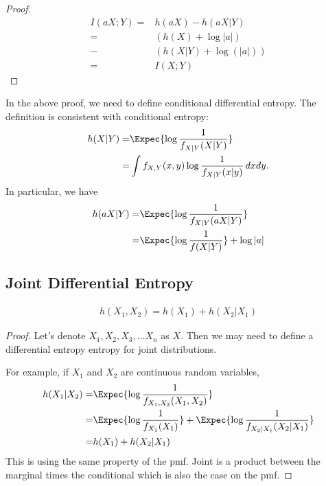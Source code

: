 \documentclass{article}
\begin{document}
\begin{proof}
    \begin{align}
        I(aX;Y)
        =&h(aX)-h(aX | Y)\\
        =&(h(X) + \log{|a|}) \\
        -&(h(X|Y) + \log(|a|)) \\
        =& I(X;Y)
    \end{align}
\end{proof}

\begin{remark}
    In the above proof, we need to define conditional differential entropy.
    The definition is consistent with conditional entropy:
    \begin{align*}
        h(X|Y)=&\Expec{\log{\frac{1}{f_{X|Y}(X|Y)}}}\\
        =&\int f_{X, Y}(x, y) \log{\frac{1}{f_{X|Y}(x|y)}}\,dx dy.
    \end{align*}
    In particular, we have
    \begin{align*}
        h(aX|Y)=&\Expec{\log{\frac{1}{f_{X|Y}(aX|Y)}}}\\
         =&  \Expec{\log{\frac{1}{f(X|Y)}}}+\log{|a|}
    \end{align*}
\end{remark}

\subsection{Joint Differential Entropy}

\begin{theorem}       
\begin{align}
h(X_1, X_2) = h(X_1)+h(X_2|X_1)
\end{align}
\end{theorem}

\begin{proof} 
Let's denote $X_1,X_2,X_3,...X_n$ as $X$. Then we may need to define a differential entropy entropy for joint distributions. 

For example, if $X_1$ and $X_2$ are continuous random variables,
    \begin{align}
        h(X_1|X_2)=&\Expec{\log{\frac{1}{f_{X_1,X_2}(X_1,X_2)}}}\\
        =& \Expec{\log{\frac{1}{f_{X_1}(X_1)}}}+\Expec{\log{\frac{1}{f_{X_2|X_1}(X_2|X_1)}}}\\
        =& h(X_1)+h(X_2|X_1)
    \end{align}
   This is using the same property of the pmf.
   Joint is a product between the marginal times the conditional which is also the case on the pmf.
\end{proof}
\end{document}
